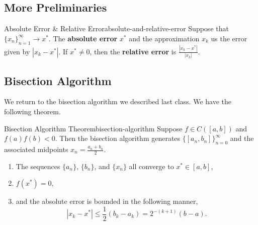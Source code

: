 \documentclass[10pt]{article}
\begin{document}
\subsection{More Preliminaries}

\begin{mydefinition}{Absolute Error \& Relative Error}{absolute-and-relative-error}
    Suppose that $\{x_{n}\}_{n=1}^{\infty}\to x^*$. The \textbf{absolute error} $x^*$ and the approximation $x_{k}$ us the error given by $|x_{k}-x^{*}|$. If $x^* \neq 0$, then the \textbf{relative error} is $\frac{|x_{k}-x^*|}{|x_k |}$. 
\end{mydefinition}

\subsection{Bisection Algorithm}

We return to the bisection algorithm we described last class. We have the following theorem.

\begin{mytheorem}{Bisection Algorithm Theorem}{bisection-algorithm}
    Suppose $f\in C([a,b])$ and $f(a)f(b)<0$. Then the bisection algorithm generates $\{[a_n, b_n]\}_{n=0}^{\infty}$ and the associated midpoints $x_{n} = \frac{a_{n}+b_n}{2}$. 

    \begin{enumerate}[label = (\roman*)]
        \item The sequences $\{a_n\}$, $\{b_n\}$, and $\{x_n\}$ all converge to $x^*\in [a,b]$,
        \item $f(x^*)=0$,
        \item and the absolute error is bounded in the following manner,
        \[
        |x_k - x^*| \leq \frac{1}{2}(b_{k}-a_{k}) = 2^{-(k+1)}(b-a).
        \]
    \end{enumerate}
\end{mytheorem}
\end{document}
